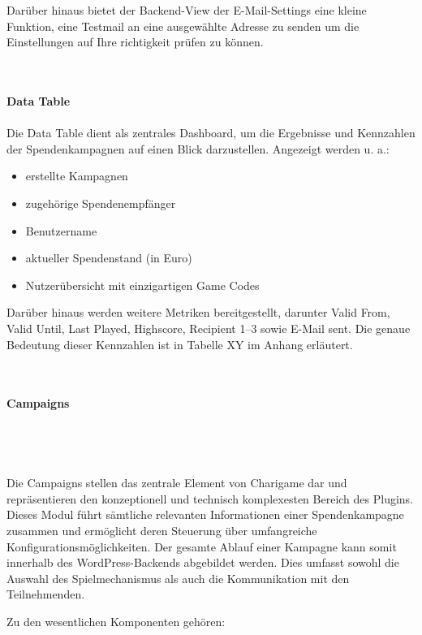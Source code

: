 Darüber hinaus bietet der Backend-View der E-Mail-Settings eine kleine Funktion, eine Testmail an eine ausgewählte Adresse zu senden um die Einstellungen auf Ihre richtigkeit prüfen zu können.

\\\\
\textbf{Data Table}\\\\
Die Data Table dient als zentrales Dashboard, um die Ergebnisse und Kennzahlen der Spendenkampagnen auf einen Blick darzustellen.
Angezeigt werden u. a.:
\begin{itemize}
    \item erstellte Kampagnen
    \item zugehörige Spendenempfänger
    \item Benutzername
    \item aktueller Spendenstand (in Euro)
    \item Nutzerübersicht mit einzigartigen Game Codes
\end{itemize}
Darüber hinaus werden weitere Metriken bereitgestellt, darunter Valid From, Valid Until, Last Played, Highscore, Recipient 1–3 sowie E-Mail sent.
Die genaue Bedeutung dieser Kennzahlen ist in Tabelle XY im Anhang erläutert.

\\\\
\textbf{Campaigns}\\\\
\\\\\\
Die Campaigns stellen das zentrale Element von Charigame dar und repräsentieren den konzeptionell und technisch komplexesten Bereich des Plugins. Dieses Modul führt sämtliche relevanten Informationen einer Spendenkampagne zusammen und ermöglicht deren Steuerung über umfangreiche Konfigurationsmöglichkeiten. Der gesamte Ablauf einer Kampagne kann somit innerhalb des WordPress-Backends abgebildet werden. Dies umfasst sowohl die Auswahl des Spielmechanismus als auch die Kommunikation mit den Teilnehmenden.

Zu den wesentlichen Komponenten gehören:

